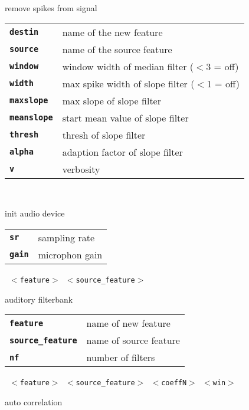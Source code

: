 \begin{description}
\begin{description}
        remove spikes from signal

      \begin{tabular}{ll}
 \texttt{\textbf{destin}} &    name of the new feature \\
 \texttt{\textbf{source}} &    name of the source feature \\
 \texttt{\textbf{window}} &     window width of median filter ($<$3 = off)  \\
 \texttt{\textbf{width}} &      max spike width of slope filter ($<$1 = off)  \\
 \texttt{\textbf{maxslope}} &   max slope of slope filter  \\
 \texttt{\textbf{meanslope}} &  start mean value of slope filter  \\
 \texttt{\textbf{thresh}} &     thresh of slope filter  \\
 \texttt{\textbf{alpha}} &      adaption factor of slope filter  \\
 \texttt{\textbf{v}} &          verbosity  \\
      \end{tabular}
       \texttt{  } \

        init audio device

      \begin{tabular}{ll}
 \texttt{\textbf{sr}} &    sampling rate  \\
 \texttt{\textbf{gain}} &  microphon gain  \\
      \end{tabular}
       \texttt{ $<$feature$>$ $<$source\_feature$>$ } \

        auditory filterbank

      \begin{tabular}{ll}
 \texttt{\textbf{feature}} &         name of new feature \\
 \texttt{\textbf{source\_feature}} &  name of source feature \\
 \texttt{\textbf{nf}} &               number of filters  \\
      \end{tabular}
       \texttt{ $<$feature$>$ $<$source\_feature$>$ $<$coeffN$>$ $<$win$>$ } \

        auto correlation


\end{description}
\end{description}

